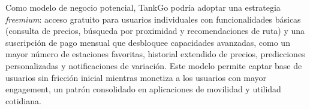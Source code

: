 Como modelo de negocio potencial, TankGo podría adoptar una estrategia
\textit{freemium}: acceso gratuito para usuarios individuales con funcionalidades
básicas (consulta de precios, búsqueda por proximidad y recomendaciones de
ruta) y una suscripción de pago mensual que desbloquee capacidades avanzadas,
como un mayor número de estaciones favoritas, historial extendido de precios,
predicciones personalizadas y notificaciones de variación. Este modelo permite
captar base de usuarios sin fricción inicial mientras monetiza a los usuarios
con mayor engagement, un patrón consolidado en aplicaciones de movilidad y
utilidad cotidiana.